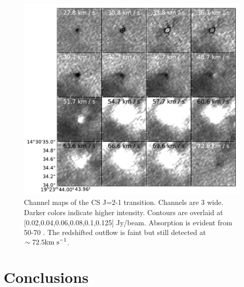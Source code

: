 \documentclass[twocolumn]{aastex62}
\begin{document}
\begin{figure}
    \includegraphics[]{figures/CS_maser_channel_maps.pdf}
    \caption{Channel maps of the CS J=2-1 transition.  Channels are 3 \kms
    wide.  Darker colors indicate higher intensity.  Contours are overlaid at
    [0.02,0.04,0.06,0.08,0.1,0.125] Jy/beam.  Absorption is evident from 50-70
    \kms.  The redshifted outflow is faint but still detected at
    $\sim72.5\textrm{km~s}^{-1}$.
    }
    \label{fig:channelmaps}
\end{figure}

\section{Conclusions}


\end{document}
